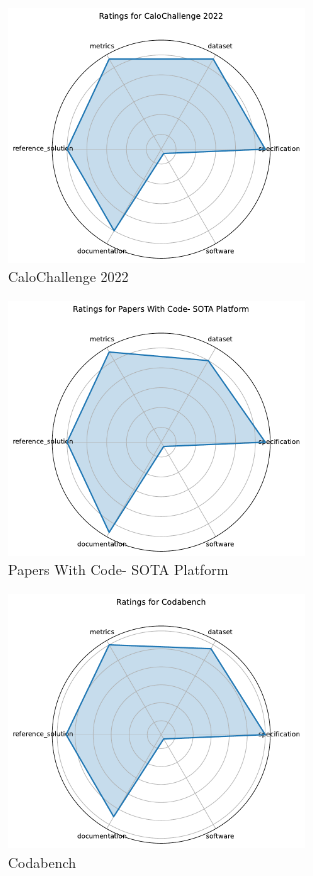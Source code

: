 \documentclass{article}
\begin{document}
\begin{figure}[h!]
  \centering
  \includegraphics[width=0.7\textwidth]{CaloChallenge 2022_radar.pdf}
  \caption{CaloChallenge 2022}
\end{figure}

\begin{figure}[h!]
  \centering
  \includegraphics[width=0.7\textwidth]{Papers With Code- SOTA Platform_radar.pdf}
  \caption{Papers With Code- SOTA Platform}
\end{figure}

\begin{figure}[h!]
  \centering
  \includegraphics[width=0.7\textwidth]{Codabench_radar.pdf}
  \caption{Codabench}
\end{figure}
\end{document}
